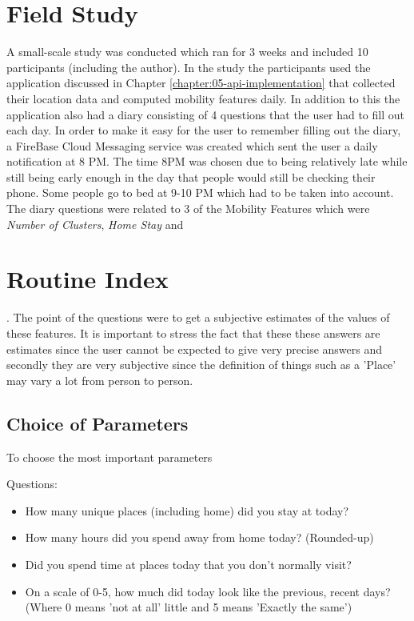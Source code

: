 \section{Field Study}
A small-scale study was conducted which ran for 3 weeks and included 10 participants (including the author). In the study the participants used the application discussed in Chapter \ref{chapter:05-api-implementation} that collected their location data and computed mobility features daily. In addition to this the application also had a diary consisting of 4 questions that the user had to fill out each day. In order to make it easy for the user to remember filling out the diary, a FireBase Cloud Messaging service was created which sent the user a daily notification at 8 PM. The time 8PM was chosen due to being relatively late while still being early enough in the day that people would still be checking their phone. Some people go to bed at 9-10 PM which had to be taken into account. The diary questions were related to 3 of the Mobility Features which were \textit{Number of Clusters}, \textit{Home Stay} and \section{Routine Index}. The point of the questions were to get a subjective estimates of the values of these features. It is important to stress the fact that these these answers are estimates since the user cannot be expected to give very precise answers and secondly they are very subjective since the definition of things such as a 'Place' may vary a lot from person to person.

\subsection{Choice of Parameters}
To choose the most important parameters 

Questions:

\begin{itemize}
    \item How many unique places (including home) did you stay at today?
    \item How many hours did you spend away from home today? (Rounded-up)
    \item Did you spend time at places today that you don't normally visit?
    \item On a scale of 0-5, how much did today look like the previous, recent days? (Where 0 means 'not at all' little and 5 means 'Exactly the same')
   
\end{itemize}

